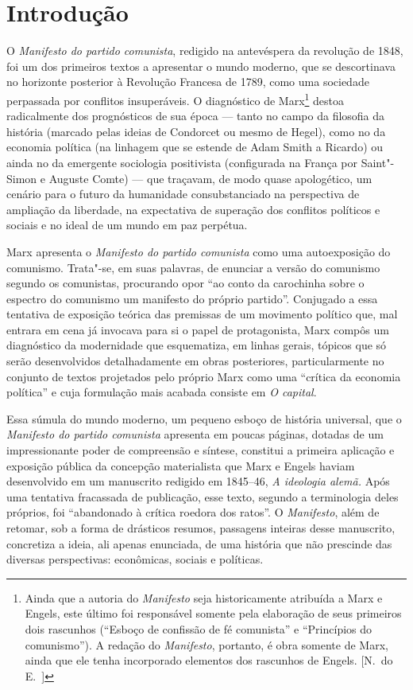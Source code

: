 \chapter[Introdução, por Ricardo Musse][Introdução]{Introdução}

O \textit{Manifesto do partido comunista}, redigido na antevéspera da
revolução de 1848, foi um dos primeiros textos a apresentar o mundo
moderno, que se descortinava no horizonte posterior à Revolução
Francesa de 1789, como uma sociedade perpassada por conflitos
insuperáveis. O diagnóstico de Marx\footnote{ Ainda que a autoria do \textit{Manifesto} 
seja historicamente atribuída a Marx e Engels, este último foi responsável somente pela 
elaboração de seus primeiros dois rascunhos (“Esboço de confissão de fé comunista” e “Princípios do comunismo”). 
A redação do \textit{Manifesto}, portanto, é obra somente de Marx, ainda que ele tenha incorporado 
elementos dos rascunhos de Engels. [N.~do E.~]} destoa radicalmente dos
prognósticos de sua época --- tanto no campo da filosofia da história
(marcado pelas ideias de Condorcet ou mesmo de Hegel), como no da
economia política (na linhagem que se estende de Adam Smith a Ricardo)
ou ainda no da emergente sociologia positivista (configurada na França
por Saint"-Simon e Auguste Comte) --- que traçavam, de modo quase
apologético, um cenário para o futuro da humanidade consubstanciado na
perspectiva de ampliação da liberdade, na expectativa de superação dos
conflitos políticos e sociais e no ideal de um mundo em paz perpétua.

Marx apresenta o \textit{Manifesto do partido comunista} como uma
autoexposição do comunismo. Trata"-se, em suas palavras, de
enunciar a versão do comunismo segundo os comunistas, procurando opor
“ao conto da carochinha sobre o espectro do comunismo um manifesto do próprio partido”.
Conjugado a essa tentativa de exposição teórica das premissas de um
movimento político que, mal entrara em cena já invocava para si o papel
de protagonista, Marx compôs um diagnóstico da modernidade que
esquematiza, em linhas gerais, tópicos que só serão desenvolvidos
detalhadamente em obras posteriores, particularmente no conjunto de
textos projetados pelo próprio Marx como uma “crítica da economia
política” e cuja formulação mais acabada consiste em \textit{O
capital}.

Essa súmula do mundo moderno, um pequeno esboço de história universal,
que o \textit{Manifesto do partido comunista} apresenta em poucas
páginas, dotadas de um impressionante poder de compreensão e síntese,
constitui a primeira aplicação e exposição pública da concepção
materialista que Marx e Engels haviam desenvolvido em um manuscrito
redigido em 1845--46, \textit{A ideologia alemã.} Após uma tentativa
fracassada de publicação, esse texto, segundo a terminologia deles
próprios, foi “abandonado à crítica roedora dos ratos”. O
\textit{Manifesto}, além de retomar, sob a forma de drásticos resumos,
passagens inteiras desse manuscrito, concretiza a ideia, ali apenas
enunciada, de uma história que não prescinde das diversas perspectivas:
econômicas, sociais e políticas.

